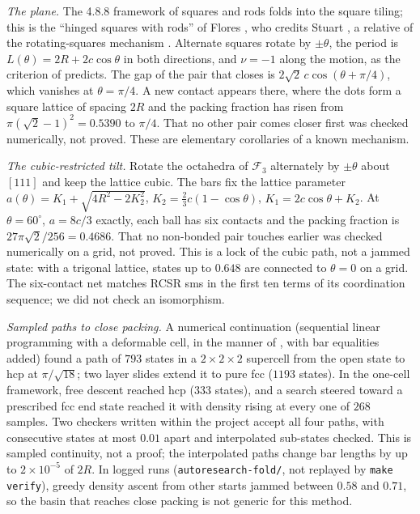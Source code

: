\documentclass[11pt]{amsart}
\theoremstyle{definition}
\theoremstyle{remark}
\begin{document}
\emph{The plane.} The 4.8.8 framework of squares and rods folds into the square tiling; this is the ``hinged squares with rods'' of Flores \cite{Flores}, who credits Stuart \cite{Stuart1963}, a relative of the rotating-squares mechanism \cite{GrimaEvans2000}. Alternate squares rotate by $\pm\theta$, the period is $L(\theta)=2R+2c\cos\theta$ in both directions, and $\nu=-1$ along the motion, as the criterion of \cite{Mitschke2013EPL} predicts. The gap of the pair that closes is $2\sqrt2\,c\cos(\theta+\pi/4)$, which vanishes at $\theta=\pi/4$. A new contact appears there, where the dots form a square lattice of spacing $2R$ and the packing fraction has risen from $\pi(\sqrt2-1)^2=0.5390$ to $\pi/4$. That no other pair comes closer first was checked numerically, not proved. These are elementary corollaries of a known mechanism.

\emph{The cubic-restricted tilt.} Rotate the octahedra of $\mathcal F_3$ alternately by $\pm\theta$ about $[111]$ and keep the lattice cubic. The bars fix the lattice parameter $a(\theta)=K_1+\sqrt{4R^2-2K_2^2}$, $K_2=\frac23c(1-\cos\theta)$, $K_1=2c\cos\theta+K_2$. At $\theta=60^\circ$, $a=8c/3$ exactly, each ball has six contacts and the packing fraction is $27\pi\sqrt2/256=0.4686$. That no non-bonded pair touches earlier was checked numerically on a grid, not proved. This is a lock of the cubic path, not a jammed state: with a trigonal lattice, states up to $0.648$ are connected to $\theta=0$ on a grid. The six-contact net matches RCSR \textsf{sms} in the first ten terms of its coordination sequence; we did not check an isomorphism.

\emph{Sampled paths to close packing.} A numerical continuation (sequential linear programming with a deformable cell, in the manner of \cite{TorquatoJiao2010}, with bar equalities added) found a path of $793$ states in a $2\times2\times2$ supercell from the open state to hcp at $\pi/\sqrt{18}$; two layer slides extend it to pure fcc ($1193$ states). In the one-cell framework, free descent reached hcp ($333$ states), and a search steered toward a prescribed fcc end state reached it with density rising at every one of $268$ samples. Two checkers written within the project accept all four paths, with consecutive states at most $0.01$ apart and interpolated sub-states checked. This is sampled continuity, not a proof; the interpolated paths change bar lengths by up to $2\times10^{-5}$ of $2R$. In logged runs (\texttt{autoresearch-fold/}, not replayed by \texttt{make verify}), greedy density ascent from other starts jammed between $0.58$ and $0.71$, so the basin that reaches close packing is not generic for this method.
\end{document}
